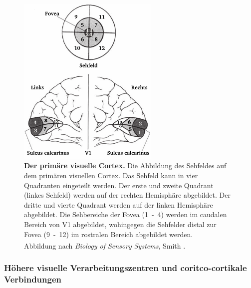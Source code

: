 \documentclass[12pt,a4paper,pdftex]{article}
\begin{document}
\begin{figure}[H]
    \centering
    \includegraphics[width = 0.6\textwidth]{pictures/visual/V1.png}
    \caption[Der primäre visuelle Cortex]{\textbf{Der primäre visuelle Cortex.} Die Abbildung des Sehfeldes auf dem primären visuellen Cortex. Das Sehfeld kann in vier Quadranten eingeteilt werden. Der erste und zweite Quadrant (linkes Sehfeld) werden auf der rechten Hemisphäre abgebildet. Der dritte und vierte Quadrant werden auf der linken Hemisphäre abgebildet. Die Sehbereiche der Fovea (1~-~4) werden im caudalen Bereich von V1 abgebildet, wohingegen die Sehfelder distal zur Fovea (9~-~12) im rostralen Bereich abgebildet werden.\\
    Abbildung nach \textit{Biology of Sensory Systems}, Smith \textsuperscript{\cite[18]{smith2008biology}}.}
    \label{fig:V1}
\end{figure}


\subsubsection*{Höhere visuelle Verarbeitungszentren und coritco-cortikale Verbindungen}
\end{document}
